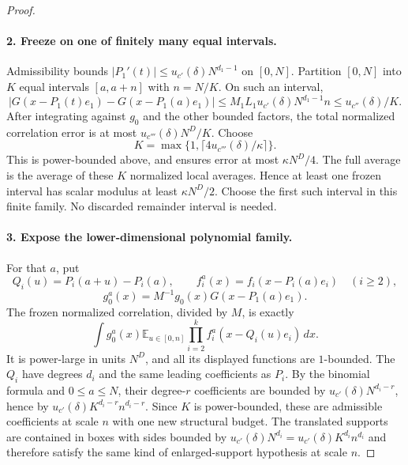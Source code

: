 \documentclass[11pt]{article}
\theoremstyle{definition}
\begin{document}
\begin{proof}
\paragraph{2. Freeze on one of finitely many equal intervals.}
Admissibility bounds $|P_1'(t)|\leq u_{c'}(\delta)N^{d_1-1}$ on $[0,N]$.
Partition $[0,N]$ into $K$ equal intervals $[a,a+n]$ with $n=N/K$.
On such an interval,
\[
 |G(x-P_1(t)e_1)-G(x-P_1(a)e_1)|
 \leq M_1L_1u_{c'}(\delta)N^{d_1-1}n
 \leq u_{c''}(\delta)/K.
\]
After integrating against $g_0$ and the other bounded factors, the total normalized
correlation error is at most $u_{c'''}(\delta)N^D/K$.
Choose
\[
 K=\max\{1,\lceil 4u_{c'''}(\delta)/\kappa\rceil\}.
\]
This is power-bounded above, and ensures error at most $\kappa N^D/4$.
The full average is the average of these $K$ normalized local averages.  Hence at least one
frozen interval has scalar modulus at least $\kappa N^D/2$.
Choose the first such interval in this finite family.  No discarded remainder interval is needed.

\paragraph{3. Expose the lower-dimensional polynomial family.}
For that $a$, put
\[
 Q_i(u)=P_i(a+u)-P_i(a),\qquad
 f_i^a(x)=f_i(x-P_i(a)e_i)\quad(i\geq2),
\]
\[
 g_0^a(x)=M^{-1}g_0(x)G(x-P_1(a)e_1).
\]
The frozen normalized correlation, divided by $M$, is exactly
\[
 \label{patch:frozen-correlation}
 \int g_0^a(x)\mathbb E_{u\in[0,n]}
               \prod_{i=2}^k f_i^a(x-Q_i(u)e_i)\,dx.
 \tag{\theequation}
\]
It is power-large in units $N^D$, and all its displayed functions are $1$-bounded.
The $Q_i$ have degrees $d_i$ and the same leading coefficients as $P_i$.
By the binomial formula and $0\leq a\leq N$, their degree-$r$ coefficients are bounded by
$u_{c'}(\delta)N^{d_i-r}$, hence by
$u_{c'}(\delta)K^{d_i-r}n^{d_i-r}$.
Since $K$ is power-bounded, these are admissible coefficients at scale $n$ with one new
structural budget.  The translated supports are contained in boxes with sides bounded by
$u_{c'}(\delta)N^{d_i}=u_{c'}(\delta)K^{d_i}n^{d_i}$ and therefore satisfy the same kind
of enlarged-support hypothesis at scale $n$.


\end{proof}
\end{document}
